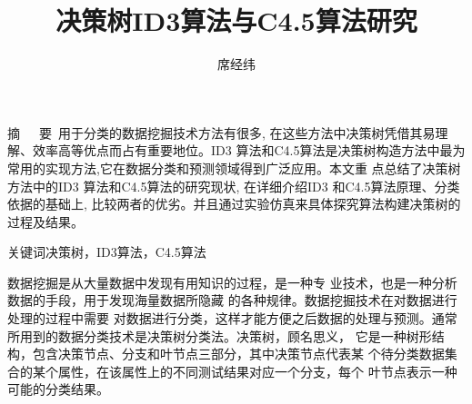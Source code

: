 \documentclass[11pt,a4paper]{article}
\title{\huge{决策树ID3算法与C4.5算法研究}}
\author{席经纬}
\affil{上海交通大学\quad 电子信息与电气工程学院}
\date{}  %
\begin{document}
\maketitle
\setlength{\oddsidemargin}{0.5cm}
\setlength{\evensidemargin}{\oddsidemargin}
\setlength{\textwidth}{14cm}
\vspace{-.8cm}
\begin{center}
\parbox{\textwidth}{
摘~~~要\quad {}~用于分类的数据挖掘技术方法有很多, 在这些方法中决策树凭借其易理解、效率高等优点而占有重要地位。ID3 算法和C4.5算法是决策树构造方法中最为常用的实现方法,它在数据分类和预测领域得到广泛应用。本文重
点总结了决策树方法中的ID3 算法和C4.5算法的研究现状, 在详细介绍ID3 和C4.5算法原理、分类依据的基础上, 比较两者的优劣。并且通过实验仿真来具体探究算法构建决策树的过程及结果。

关键词\quad{}决策树，ID3算法，C4.5算法\\}
\end{center}
%
\setlength{\oddsidemargin}{-.5cm}  %
\setlength{\evensidemargin}{\oddsidemargin}
\setlength{\textwidth}{17.00cm}


数据挖掘是从大量数据中发现有用知识的过程，是一种专
业技术，也是一种分析数据的手段，用于发现海量数据所隐藏
的各种规律。数据挖掘技术在对数据进行处理的过程中需要
对数据进行分类，这样才能方便之后数据的处理与预测。通常
所用到的数据分类技术是决策树分类法。决策树，顾名思义，
它是一种树形结构，包含决策节点、分支和叶节点三部分，其中决策节点代表某
个待分类数据集合的某个属性，在该属性上的不同测试结果对应一个分支，每个
叶节点表示一种可能的分类结果。
\end{document}
